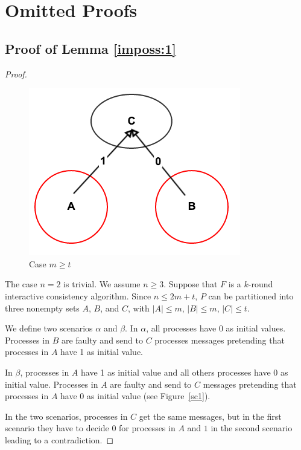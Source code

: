 
\section{Omitted Proofs}

\subsection{Proof of Lemma \ref{imposs:1}} \label{app:imposs:1}
\begin{proof}
\begin{figure}[h]
  \centering
  \includegraphics[scale=0.35]{impossible1.png}
  \caption{Case $m \geqslant t$  }
\end{figure}\label{sc1}

%
  The case $n=2$ is trivial. We assume $n \geqslant 3$.
  Suppose that $F$ is a $k$-round interactive consistency algorithm. Since $n \leqslant
  2m+t$, $P$ can be partitioned into three nonempty sets $A$, $B$, and $C$,
  with $| A | \leqslant m$, $| B | \leqslant m$, $| C | \leqslant t$. 
  
  We define two scenarios $\alpha$ and $\beta$.
  In $\alpha$, all processes have 0 as initial values.
  Processes in $B$ are faulty and send  to $C$ processes messages
  pretending that processes in $A$ have 1 as initial value.
  
   In $\beta$, processes in $A$ have 1 as initial value and all  others processes have 0 as initial value.
  Processes in $A$ are faulty and send to $C$ messages 
  pretending that processes in $A$ have 0 as initial value (see Figure~\ref{sc1}).
  
  In the two scenarios, processes in $C$ get the same messages, but in the first scenario 
  they have to decide 0 for processes in $A$ and $1$ in the second scenario leading to a contradiction.
    

\end{proof}
